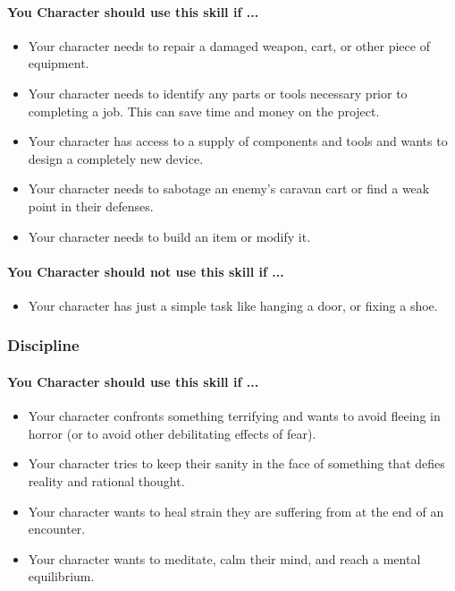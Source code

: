 \begin{multicols}{2}
\paragraph{You Character should use this skill if ...}
\begin{itemize}
    \item Your character needs to repair a damaged weapon, cart, or other piece
        of equipment.
    \item Your character needs to identify any parts or tools necessary prior to
        completing a job. This can save time and money on the project.
    \item Your character has access to a supply of components and tools and wants
        to design a completely new device.
    \item Your character needs to sabotage an enemy's caravan cart or find a weak
        point in their defenses.
    \item Your character needs to build an item or modify it.
\end{itemize}
\paragraph{You Character should not use this skill if ...}
\begin{itemize}
    \item Your character has just a simple task like hanging a door, or fixing a
        shoe.
\end{itemize}

\subsubsection{Discipline}\label{skill:discipline}
\paragraph{You Character should use this skill if ...}
\begin{itemize}
    \item Your character confronts something terrifying and wants to avoid fleeing
        in horror (or to avoid other debilitating effects of fear).
    \item Your character tries to keep their sanity in the face of something that
        defies reality and rational thought.
    \item Your character wants to heal strain they are suffering from at the end
        of an encounter.
    \item Your character wants to meditate, calm their mind, and reach a mental
        equilibrium.
\end{itemize}

\end{multicols}
